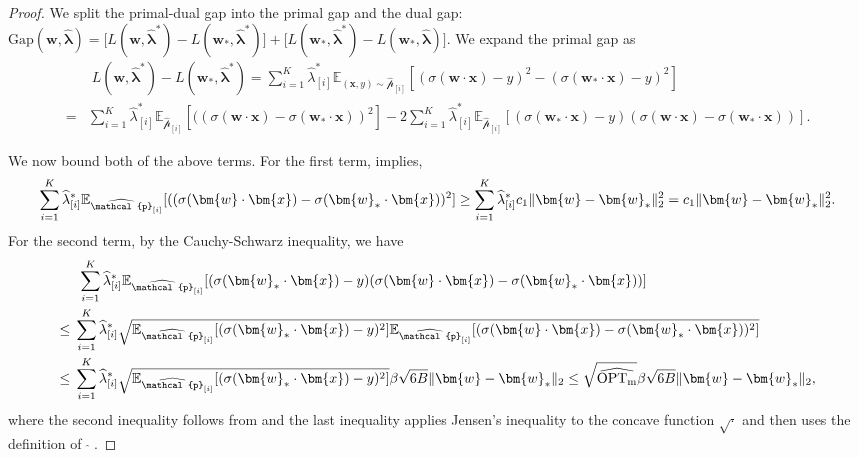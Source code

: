 \documentclass[11pt]{article}
\numberwithin{thm}{section}
\theoremstyle{plain}
\theoremstyle{definition}
\theoremstyle{remark} \newtheorem{remark}[thm]{Remark}
\def\vlambda{{\bm{\lambda}}}
\def\vw{{\bm{w}}}
\def\vx{{\bm{x}}}
\def\ep{\widehat{\mathcal{p}}}
\newcommand{\E}{\mathbb{E}}
\newcommand{\Gap}{\mathrm{Gap}}
\DeclarePairedDelimiter\norm{\|}{\|}
\newcommand{\epi}{\ep_{[i]}}
\newcommand{\elambda}{\widehat{\lambda}}
\newcommand{\evlambda}{\widehat{\vlambda}}
\DeclareMathOperator{\mOPT}{OPT_m}
\newcommand{\mOPThat}{\widehat{\mOPT}}
\begin{document}
\lemgaplb*
\begin{proof}
We split the primal-dual gap into the primal gap and the dual gap:
\(
\Gap(\vw,\evlambda)
= \bigl[L(\vw,\evlambda^*)-L(\vw_*,\evlambda^*)\bigr]
+ \bigl[L(\vw_*,\evlambda^*)-L(\vw_*,\evlambda)\bigr]
\).
We expand the primal gap as
    \begin{align*}
      & \;L(\vw, \evlambda^{*}) - L(\vw_*, \evlambda^{*}) = \sum_{i=1}^K\elambda_{[i]}^{*}\E_{(\vx, y) \sim \epi}[(\sigma(\vw \cdot \vx) - y)^{2} - (\sigma(\vw_* \cdot \vx) - y)^{2}] \\
      = & \sum_{i=1}^K\elambda_{[i]}^{*}\E_{\epi}[((\sigma(\vw \cdot \vx) - \sigma(\vw_* \cdot \vx))^{2}] -2\sum_{i=1}^K\elambda_{[i]}^{*}\E_{\epi}[(\sigma(\vw_* \cdot \vx) - y)(\sigma(\vw \cdot \vx) - \sigma(\vw_* \cdot \vx))].  
    \end{align*}

    We now bound both of the above terms. For the first term,  implies,
    \begin{align}\label{eq:lb-gap-sharpness}
       \sum_{i=1}^K\elambda_{[i]}^{*}\E_{\epi}[((\sigma(\vw \cdot \vx) - \sigma(\vw_* \cdot \vx))^{2}]
       \geq \sum_{i=1}^K\elambda_{[i]}^{*} c_1 \norm{\vw - \vw_*}_{2}^{2}=c_1 \norm{\vw - \vw_*}_{2}^{2}.
    \end{align}
For the second term, by the Cauchy-Schwarz inequality, we have
\begin{align}\label{eq:lb-gap-CS}
       &\; \sum_{i=1}^K\elambda_{[i]}^{*}\E_{\epi}[(\sigma(\vw_* \cdot \vx) - y)
       (\sigma(\vw \cdot \vx) - \sigma(\vw_* \cdot \vx))]\notag\\
       \leq \; & \sum_{i=1}^K\elambda_{[i]}^{*}\sqrt{\E_{\epi}[(\sigma(\vw_* \cdot \vx) - y)^2]\E_{\epi}[(\sigma(\vw \cdot \vx) - \sigma(\vw_* \cdot \vx))^2]}\notag\\
        \leq\; &  \sum_{i=1}^K\elambda_{[i]}^{*} \sqrt{\E_{\epi}[(\sigma(\vw_* \cdot \vx) - y)^2]} \beta\sqrt{6 B}\|\vw - \vw_*\|_2 \le   \sqrt{\mOPThat} \beta\sqrt{6 B}\|\vw - \vw_*\|_2,
    \end{align}
    where the second inequality follows from  and the last inequality applies Jensen's inequality to the concave function $\sqrt{\cdot}$ and then uses the definition of $\mOPThat$.


\end{proof}
\end{document}
